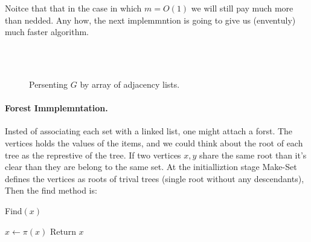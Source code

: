Noitce that that in the case in which $m = O\left( 1 \right)$ we will still pay much more than nedded. Any how, the next implemmntion is going to give us (enventuly) much faster algorithm.

\begin{figure}[h]
  \centering
  \begin{subfigure}[b]{0.25\textwidth}
    \\ \\  
  \end{subfigure} 
  \begin{subfigure}[b]{0.49\textwidth}
  \end{subfigure}
  \caption{ Persenting $G$ by array of adjacency lists.  }
\end{figure}


\paragraph{Forest Immplemntation.} Insted of associating each set with a linked list, one might attach a forst. The vertices holds the values of the items, and we could think about the root of each tree as the represtive of the tree. If two vertices $x,y$ share the same root than it's clear than they are belong to the same set. At the initialliztion stage Make-Set defines the vertices as roots of trival trees (single root without any descendants), Then the find method is: 
\begin{algbox}{Find$(x)$}
  \begin{algorithm}[H]
     { 
      $ x \leftarrow \pi\left( x \right)$
    }
    Return $x$ 
  \end{algorithm}    
\end{algbox}

